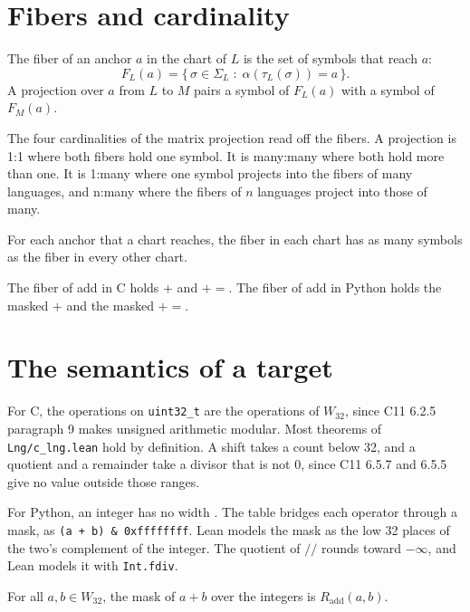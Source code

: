 \section{Fibers and cardinality}

\begin{definition}
The fiber of an anchor $a$ in the chart of $L$ is the set of symbols that reach $a$:
\[
  F_L(a) = \{\, \sigma \in \Sigma_L \;:\; \alpha(\tau_L(\sigma)) = a \,\}.
\]
A projection over $a$ from $L$ to $M$ pairs a symbol of $F_L(a)$ with a symbol of $F_M(a)$.
\end{definition}

The four cardinalities of the matrix projection read off the fibers. A projection is 1:1 where both fibers hold
one symbol. It is many:many where both hold more than one. It is 1:many where one symbol projects into the fibers
of many languages, and n:many where the fibers of $n$ languages project into those of many.

\begin{theorem}
For each anchor that a chart reaches, the fiber in each chart has as many symbols as the fiber in every other chart.
\end{theorem}

\begin{theorem}
The fiber of add in C holds $+$ and $+{=}$. The fiber of add in Python holds the masked $+$ and the masked $+{=}$.
\end{theorem}

\section{The semantics of a target}

For C, the operations on \texttt{uint32\_t} are the operations of $W_{32}$, since C11 6.2.5 paragraph 9 makes
unsigned arithmetic modular. Most theorems of \texttt{Lng/c\_lng.lean} hold by definition. A shift takes a count
below 32, and a quotient and a remainder take a divisor that is not 0, since C11 6.5.7 and 6.5.5 give no value
outside those ranges.

For Python, an integer has no width \cite{src:python}. The table bridges each operator through a mask, as
\texttt{(a + b) \& 0xffffffff}. Lean models the mask as the low 32 places of the two's complement of the integer.
The quotient of $/\!/$ rounds toward $-\infty$, and Lean models it with \texttt{Int.fdiv}.

\begin{theorem}
For all $a, b \in W_{32}$, the mask of $a + b$ over the integers is $R_{\mathrm{add}}(a, b)$.
\end{theorem}

